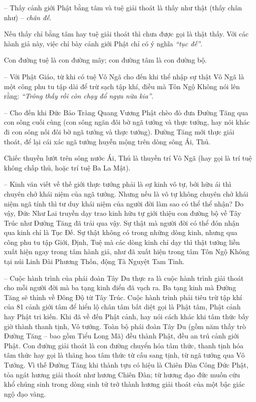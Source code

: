 -- Thấy cảnh giới Phật bằng tâm và tuệ giải thoát là thấy như thật (thấy chân như) -- \emph{chân đế}.

Nếu thấy chỉ bằng tâm hay tuệ giải thoát thì chưa được gọi là thật thấy. Với các hành giả này, việc chỉ bày cảnh giới Phật chỉ có ý nghĩa \emph{``tục đế''}.

Con đường tuệ là con đường mây; con đường tâm là con đường bộ.

-- Với Phật Giáo, từ khi có tuệ Vô Ngã cho đến khi thể nhập sự thật Vô Ngã là một công phu tu tập dài để trừ sạch tập khí, điều mà Tôn Ngộ Không nói lên rằng: \emph{``Trông thấy rồi còn chạy đổ ngựa nữa kia''}.

-- Cho đến khi Đức Bảo Tràng Quang Vương Phật chèo đò đưa Đường Tăng qua con sông cuối cùng (con sông ngăn đôi bờ ngã tướng và thực tướng, hay nói khác đi con sông nối đôi bờ ngã tướng và thực tướng). Đường Tăng mới thực giải thoát, để lại cái xác ngã tướng huyễn mộng trên dòng sông Ái, Thủ.

Chiếc thuyền lướt trên sông nước Ái, Thủ là thuyền trí Vô Ngã (hay gọi là trí tuệ không chấp thủ, hoặc trí tuệ Ba La Mật).

-- Kinh văn viết về thế giới thực tướng phải là sự kinh vô tự, bởi hữu ái thì chuyên chở khái niệm của ngã tướng. Nhưng nếu là vô tự không chuyên chở khái niệm ngã tính thì tư duy khái niệm của người đời làm sao có thể thể nhận? Do vậy, Đức Như Lai truyền dạy trao kinh hữu tự giới thiệu con đường bộ về Tây Trúc như Đường Tăng đã trải qua vậy. Sự thật mà người đời có thể đón nhận qua kinh chỉ là Tục Đế. Sự thật không có trong những dòng kinh, nhưng qua công phu tu tập Giới, Định, Tuệ mà các dòng kinh chỉ dạy thì thật tướng liền xuất hiện ngay trong tâm hành giả, như đã xuất hiện trong tâm Tôn Ngộ Không tại núi Linh Đài Phương Thốn, động Tà Nguyệt Tam Tinh.

-- Cuộc hành trình của phái đoàn Tây Du thực ra là cuộc hành trình giải thoát cho mỗi người đời mà ba tạng kinh điển đã vạch ra. Ba tạng kinh mà Đường Tăng sẽ thỉnh về Đông Độ từ Tây Trúc. Cuộc hành trình phải tiêu trừ tập khí của 81 cảnh giới tâm để hiển lộ chân tâm bất diệt gọi là Phật tâm, Phật cảnh hay Phật tri kiến. Khi đã về đến Phật cảnh, hay nói cách khác khi tâm thức bấy giờ thành thanh tịnh, Vô tướng. Toàn bộ phái đoàn Tây Du (gồm năm thầy trò Đường Tăng -- bao gồm Tiểu Long Mã) đều thành Phật, đều an trú cảnh giới Phật. Con đường giải thoát là con đường chuyển hóa tâm thức, thanh tịnh hóa tâm thức hay gọi là thăng hoa tâm thức từ cấu sang tịnh, từ ngã tướng qua Vô Tướng. Vì thế Đường Tăng khi thành tựu có hiệu là Chiên Đàn Công Đức Phật, tỏa ngát hương giải thoát như hương Chiên Đàn; từ hương đạo đức muốn cứu khổ chúng sinh trong dòng sinh tử trở thành hương giải thoát của một bậc giác ngộ đạo vàng.


